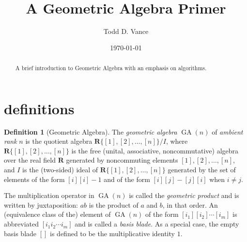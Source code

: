 \documentclass{amsproc}
\theoremstyle{definition}
\newtheorem{definition}[theorem]{Definition}
\theoremstyle{remark}
\numberwithin{equation}{section}
\begin{document}
\title{A Geometric Algebra Primer}
\author[T. D. Vance]{Todd D. Vance}
\date{\today}

\begin{abstract}
  A brief introduction to Geometric Algebra with an emphasis on algorithms.
\end{abstract}

\maketitle{}

\newcommand{\term}[1]{\emph{#1}}

\newcommand{\ga}{\ensuremath{\mathop{\mathrm{GA}}}}

\section{definitions}

\begin{definition}[Geometric Algebra]
  The \term{geometric algebra} $\ga(n)$ of \term{ambient rank} $n$ is
  the quotient algebra $\mathbf{R}\{[1], [2], \dots, [n]\}/I$, where
  $\mathbf{R}\{[1], [2], \dots, [n]\}$ is the free (unital,
  associative, noncommutative) algebra over the real field
  $\mathbf{R}$ generated by noncommuting elements $[1], [2], \dots,
  [n]$, and $I$ is the (two-sided) ideal of $\mathbf{R}\{[1], [2],
  \dots, [n]\}$ generated by the set of elements of the form $[i][i] -
  1$ and of the form $[i][j] - [j][i]$ when $i\ne{j}$.
\end{definition}

The multiplication operator in $\ga(n)$ is called the \term{geometric
  product} and is written by juxtaposition: $ab$ is the product of $a$
and $b$, in that order.  An (equivalence class of the) element of
$\ga(n)$ of the form $[i_1][i_2]\cdots[i_m]$ is abbreviated
$[i_1i_2\cdots{i}_m]$ and is called a \term{basis blade}.  As a
special case, the empty basis blade $[]$ is defined to be the
multiplicative identity $1$.
\end{document}
